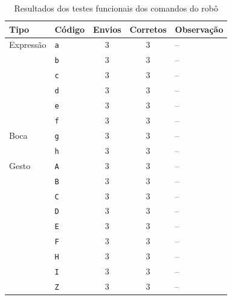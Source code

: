 \begin{table}[htbp]
    \centering
    \caption{Resultados dos testes funcionais dos comandos do robô}
    \label{tab:funcionais}
    \small
    \begin{tabular}{llccp{6cm}}
        \hline
        \textbf{Tipo} & \textbf{Código} & \textbf{Envios} & \textbf{Corretos} & \textbf{Observação} \\
        \hline
        Expressão & \texttt{a} & 3 & 3 & -- \\
         & \texttt{b} & 3 & 3 & -- \\
         & \texttt{c} & 3 & 3 & -- \\
         & \texttt{d} & 3 & 3 & -- \\
         & \texttt{e} & 3 & 3 & -- \\
         & \texttt{f} & 3 & 3 & -- \\
        \hline
        Boca & \texttt{g} & 3 & 3 & -- \\
         & \texttt{h} & 3 & 3 & -- \\
        \hline
        Gesto & \texttt{A} & 3 & 3 & -- \\
         & \texttt{B} & 3 & 3 & -- \\
         & \texttt{C} & 3 & 3 & -- \\
         & \texttt{D} & 3 & 3 & -- \\
         & \texttt{E} & 3 & 3 & -- \\
         & \texttt{F} & 3 & 3 & -- \\
         & \texttt{H} & 3 & 3 & -- \\
         & \texttt{I} & 3 & 3 & -- \\
         & \texttt{Z} & 3 & 3 & -- \\
        \hline
    \end{tabular}
\end{table}